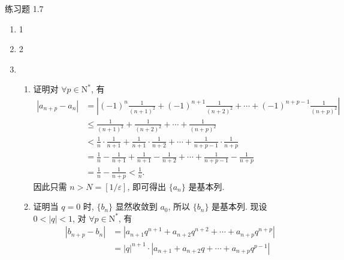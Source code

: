 



% 


\begin{center}
    {\heiti 练习题 1.7}
\end{center}

\begin{enumerate}
    \item 1
    \item 2
    \item 
        \begin{enumerate}[(1)]
            \item {\heiti 证明}\quad 对 $\forall p \in \mathrm{N}^*$, 有
                \begin{align*}
                    |a_{n+p} - a_n| &= \left|(-1)^n\frac{1}{(n+1)^2} + (-1)^{n+1}\frac{1}{(n+2)^2} + \cdots + (-1)^{n+p-1}\frac{1}{(n+p)^2}\right| \\
                                    &\leqslant \frac{1}{(n+1)^2} + \frac{1}{(n+2)^2} + \cdots + \frac{1}{(n+p)^2} \\
                                    &< \frac1n \cdot \frac{1}{n+1} + \frac{1}{n+1} \cdot \frac{1}{n+2} + \cdots + \frac{1}{n+p-1} \cdot \frac{1}{n+p} \\
                                    &= \frac1n - \frac{1}{n+1} + \frac{1}{n+1} - \frac{1}{n+2} + \cdots + \frac{1}{n+p-1} - \frac{1}{n+p} \\
                                    &= \frac1n - \frac{1}{n+p} < \frac1n.
                \end{align*}
                因此只需 $n > N = [1/\varepsilon]$, 即可得出 $\{a_n\}$ 是基本列.
            \item {\heiti 证明}\quad 当 $q = 0$ 时, $\{b_n\}$ 显然收敛到 $a_0$, 所以 $\{b_n\}$ 是基本列. 现设 $0 < |q| < 1$, 对 $\forall p \in \mathrm{N}^*$, 有
                \begin{align*}
                    |b_{n+p} - b_n| &= |a_{n+1}q^{n+1} + a_{n+2}q^{n+2} + \cdots + a_{n+p}q^{n+p}| \\
                                    &= |q|^{n+1} \cdot |a_{n+1} + a_{n+2}q + \cdots + a_{n+p}q^{p-1}| \\

\end{align*}
\end{enumerate}
\end{enumerate}
